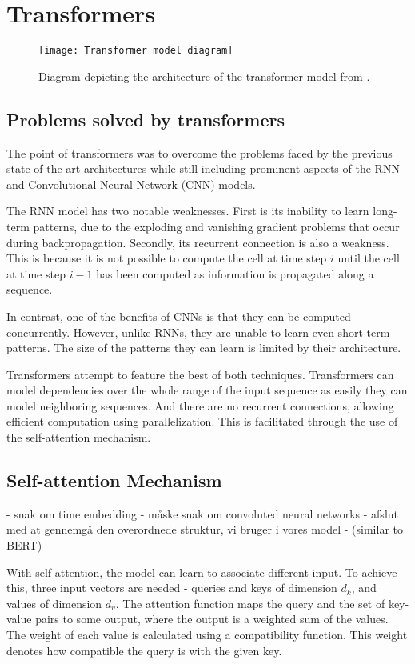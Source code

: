 \section{Transformers}
\begin{figure}[h]
\centering
\texttt{[image: Transformer model diagram]}
\caption{Diagram depicting the architecture of the transformer model from \citet{AttentionIsAllYouNeed}.}
\end{figure}
\subsection{Problems solved by transformers}
The point of transformers was to overcome the problems faced by the previous state-of-the-art architectures while still including prominent aspects of the RNN and Convolutional Neural Network (CNN) models.

The RNN model has two notable weaknesses. First is its inability to learn long-term patterns, due to the exploding and vanishing gradient problems that occur during backpropagation.
Secondly, its recurrent connection is also a weakness. This is because it is not possible to compute the cell at time step $i$ until the cell at time step $i-1$ has been computed as information is propagated along a sequence.

In contrast, one of the benefits of CNNs is that they can be computed concurrently. However, unlike RNNs, they are unable to learn even short-term patterns. The size of the patterns they can learn is limited by their architecture.

Transformers attempt to feature the best of both techniques.
Transformers can model dependencies over the whole range of the input sequence as easily they can model neighboring sequences. And there are no recurrent connections, allowing efficient computation using parallelization. This is facilitated through the use of the self-attention mechanism.\cite{TransformersScratchPeterbloem}


\subsection{Self-attention Mechanism}

- snak om time embedding 
- måske snak om convoluted neural networks 
- afslut med at gennemgå den overordnede struktur, vi bruger i vores model - (similar to BERT)

With self-attention, the model can learn to associate different input.
To achieve this, three input vectors are needed - queries and keys of dimension $d_k$, and values of dimension $d_v$.
The attention function maps the query and the set of key-value pairs to some output, where the output is a weighted sum of the values.
The weight of each value is calculated using a compatibility function.
This weight denotes how compatible the query is with the given key.



